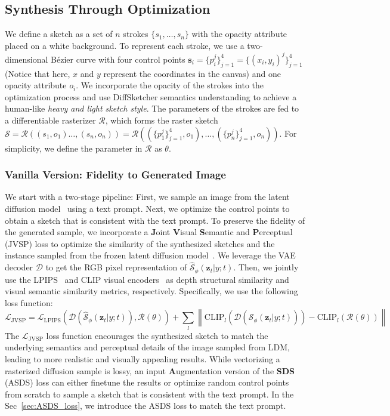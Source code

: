 \documentclass{article}
\begin{document}
\subsection{Synthesis Through Optimization}
We define a sketch as a set of $n$ strokes $\{s_1, \dots, s_n\}$ with the opacity attribute placed on a white background. 
To represent each stroke, we use a two-dimensional Bézier curve with four control points $\mathbf{s}_i = \{p_i^j\}_{j=1}^4 = \{(x_i,y_i)^j\}_{j=1}^4$ (Notice that here, $x$ and $y$ represent the coordinates in the canvas) and one opacity attribute $o_i$.
We incorporate the opacity of the strokes into the optimization process and use DiffSketcher semantics understanding to achieve a human-like \textit{heavy and light sketch style}.
The parameters of the strokes are fed to a differentiable rasterizer $\mathcal{R}$, which forms the raster sketch $\mathcal{S} = \mathcal{R} ((s_1,o_1) \dots, (s_n, o_n)) = \mathcal{R} ((\{p_1^j\}_{j=1}^4, o_1), \dots, (\{p_n^j\}_{j=1}^4, o_n))$. For simplicity, we define the parameter in $\mathcal{R}$ as $\theta$.

\subsubsection{Vanilla Version: Fidelity to Generated Image}
\label{sec:vanilla_version}
We start with a two-stage pipeline: First, we sample an image from the latent diffusion model~\cite{ldm_2022_Rombach} using a text prompt. Next, we optimize the control points to obtain a sketch that is consistent with the text prompt. 
To preserve the fidelity of the generated sample, we incorporate a \textbf{J}oint \textbf{V}isual \textbf{S}emantic and \textbf{P}erceptual (JVSP) loss to optimize the similarity of the synthesized sketches and the instance sampled from the frozen latent diffusion model~\cite{ldm_2022_Rombach}.
We leverage the VAE~\cite{taming_2021_esser} decoder $\mathcal{D}$ to get the RGB pixel representation of $\hat{\mathcal{S}}_{\phi}(\bm{z}_t|y;t)$.
Then, we jointly use the LPIPS~\cite{lpips_zhang_2018} and CLIP visual encoders~\cite{clip_radford_2021,vinker_2022_clipasso} as depth structural similarity and visual semantic similarity metrics, respectively.
Specifically, we use the following loss function:
\begin{equation}
\mathcal{L}_{\mathrm{JVSP}} = 
\mathcal{L}_{\mathrm{LPIPS}}(\mathcal{D}(\hat{\mathcal{S}}_{\phi}(\bm{z}_t|y;t)), \mathcal{R}(\theta)) + 
\sum_l \left\| \mathrm{CLIP}_l (\mathcal{D}(\hat{\mathcal{S}}_{\phi}(\bm{z}_t|y;t))) - \mathrm{CLIP}_l (\mathcal{R}(\theta)) \right\|
\end{equation}
The $\mathcal{L}_{\mathrm{JVSP}}$ loss function encourages the synthesized sketch to match the underlying semantics and perceptual details of the image sampled from LDM, leading to more realistic and visually appealing results.
While vectorizing a rasterized diffusion sample is lossy, an input \textbf{A}ugmentation version of the \textbf{SDS} (ASDS) loss can either finetune the results or optimize random control points from scratch to sample a sketch that is consistent with the text prompt.
In the Sec~\ref{sec:ASDS_loss}, we introduce the ASDS loss to match the text prompt.
\end{document}
